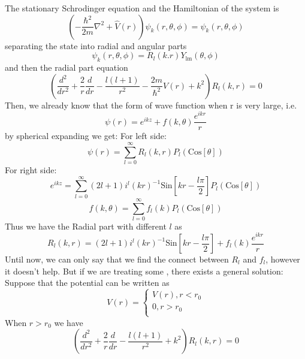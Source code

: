 The stationary Schrodinger equation and the Hamiltonian of the system is
\begin{equation}
\left(-\frac{\hbar ^2}{2m}\nabla ^2+\hat{V}(r)\right)\psi _k(r,\theta ,\phi )=\psi _k(r,\theta ,\phi )
\end{equation}
separating the state into radial and angular parts
\begin{equation}
\psi _k(r,\theta ,\phi )=R_l(k.r)Y_{\text{lm}}(\theta,\phi)
\end{equation}
and then the radial part equation
\begin{equation}
\left(\frac{d^2}{dr^2}+\frac{2}{r}\frac{d}{dr}-\frac{l(l+1)}{r^2}-\frac{2m}{\hbar ^2}V(r)+k^2\right)R_l(k,r)=0
\end{equation}
Then, we already know that the form of wave function when r is very large, i.e.
\begin{equation}
\psi (r)=e^{i k z}+f(k,\theta )\frac{e^{i k r}}{r}
\end{equation}
by spherical expanding we get:
For left side:
\begin{equation}
\psi (r)=\sum _{l =0}^{\infty } R_l(k,r)P_l(\text{Cos}[\theta ])
\end{equation}
For right side:
\begin{equation}
e^{i k z}=\sum _{l=0}^{\infty}(2l+1)i^l(kr)^{-1}\text{Sin}\left[k r-\frac{l \pi }{2}\right]P_l(\text{Cos}[\theta])
\end{equation}
\begin{equation}
f(k,\theta )=\sum _{l =0}^{\infty } f_l(k)P_l(\text{Cos}[\theta ])
\end{equation}
Thus we have the Radial part with different $l$ as
\begin{equation}
R_l(k,r)=(2l+1)i^l(k r)^{-1}\text{Sin}\left[k r-\frac{l \pi }{2}\right]+f_l(k)\frac{e^{i k r}}{r}
\end{equation}
Until now, we can only say that we find the connect between $R_l$ and $f_l$, however it doesn't help. But if we are treating some , there exists a general solution:
Suppose that the potential can be written as
\begin{equation}
V(r)=\left\{
\begin{array}{c}
 V(r), r<r_0 \\
 0, r>r_0 \\
\end{array}
\right.
\end{equation}
When $r>r_0$ we have
\begin{equation}
\left(\frac{d^2}{dr^2}+\frac{2}{r}\frac{d}{dr}-\frac{l(l+1)}{r^2}+k^2\right)R_l(k,r)=0
\end{equation}
